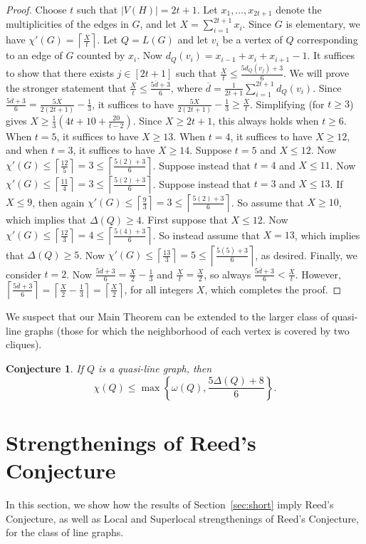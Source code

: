 \documentclass[12pt]{article}
\theoremstyle{plain}
\newtheorem{conj}[thm]{Conjecture}
\theoremstyle{definition}
\theoremstyle{remark}
\newcommand{\set}[1]{\left\{ #1 \right\}}
\newcommand{\card}[1]{\left|#1\right|}
\newcommand{\ceil}[1]{\left\lceil#1\right\rceil}
\begin{document}
\begin{proof}
Choose $t$ such that $\card{V(H)}=2t+1$.
Let $x_1,\ldots,x_{2t+1}$ denote the multiplicities of the edges in $G$, and let
$X=\sum_{i=1}^{2t+1}x_i$.  Since $G$ is elementary, we have
$\chi'(G)=\ceil{\frac{X}t}$.  
Let $Q=L(G)$ and let $v_i$ be a vertex of $Q$
corresponding to an edge of $G$ counted by $x_i$.  Now
$d_Q(v_i)=x_{i-1}+x_i+x_{i+1}-1$.  It suffices to show that there exists
$j\in[2t+1]$ such that $\frac{X}t\le \frac{5d_Q(v_j)+3}6$.  We will prove the
stronger statement that $\frac{X}t\le \frac{5\overline{d}+3}6$, where
$\overline{d}=\frac{1}{2t+1}\sum_{i=1}^{2t+1}d_Q(v_i)$.
Since $\frac{5\overline{d}+3}6 =\frac{5X}{2(2t+1)}-\frac13$, it suffices to have 
$\frac{5X}{2(2t+1)}-\frac13\ge \frac{X}t$.  Simplifying (for $t\ge 3$) gives $X\ge
\frac13(4t+10+\frac{20}{t-2})$.  Since $X\ge 2t+1$, this always holds when $t\ge
6$.  When $t=5$, it suffices to have $X\ge 13$.  When $t=4$, it suffices to have
$X\ge 12$, and when $t=3$, it suffices to have $X\ge 14$.  Suppose $t=5$ and
$X\le 12$.  
Now $\chi'(G)\le \ceil{\frac{12}5}=3\le\ceil{\frac{5(2)+3}6}$.
Suppose instead that $t=4$ and $X\le 11$.
Now $\chi'(G)\le \ceil{\frac{11}4}=3\le\ceil{\frac{5(2)+3}6}$.
Suppose instead that $t=3$ and $X\le 13$.
If $X\le 9$, then again 
$\chi'(G)\le \ceil{\frac{9}3}=3\le\ceil{\frac{5(2)+3}6}$.
So assume that $X\ge 10$, which implies that $\Delta(Q)\ge 4$.
First suppose that $X\le 12$.
Now $\chi'(G)\le \ceil{\frac{12}3}=4\le\ceil{\frac{5(4)+3}6}$.
So instead assume that $X=13$, which implies that $\Delta(Q)\ge 5$.
Now $\chi'(G)\le \ceil{\frac{13}3}=5\le\ceil{\frac{5(5)+3}6}$, as desired.
Finally, we consider $t=2$.  Now $\frac{5\overline{d}+3}6=\frac{X}2-\frac13$ and
$\frac{X}t=\frac{X}2$, so always $\frac{5\overline{d}+3}6<\frac{X}t$.  However,
$\ceil{\frac{5\overline{d}+3}6}=\ceil{\frac{X}2-\frac13}=\ceil{\frac{X}2}$, for
all integers $X$, which completes the proof.
\end{proof}

We suspect that our Main Theorem can be extended to the larger class of
quasi-line graphs (those for which the neighborhood of each vertex is covered by
two cliques).

\begin{conj}
If $Q$ is a quasi-line graph, then
\[\chi(Q)\le \max\set{\omega(Q),\frac{5\Delta(Q)+8}{6}}.\]
\end{conj}

\section{Strengthenings of Reed's Conjecture}
\label{sec:strong-reed}
In this section, we show how the results of Section~\ref{sec:short} %
imply Reed's Conjecture, as well as Local and Superlocal strengthenings of
Reed's Conjecture, for the class of line graphs.
\end{document}
